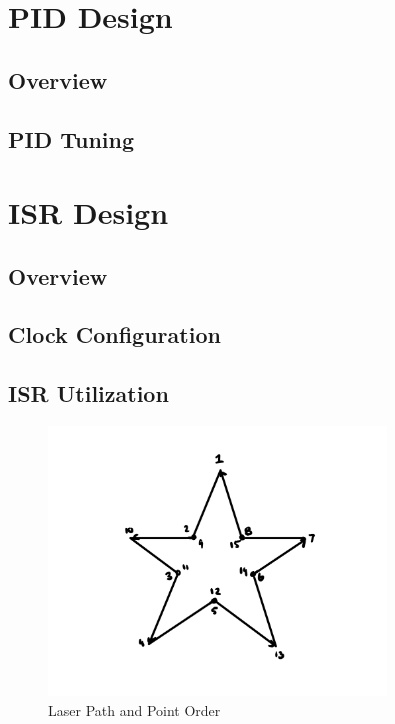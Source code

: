 \documentclass[12pt]{article}
\begin{document}
\section{PID Design}
\subsection{Overview}




\subsection{PID Tuning}



\subsection{}


\section{ISR Design}
\subsection{Overview}

\subsection{Clock Configuration}

\subsection{ISR Utilization}

\begin{figure}[ht]
    \centering
    \includegraphics[width=0.8\textwidth]{laser_path.png}
    \caption{Laser Path and Point Order}
    \label{fig:laser_path}
\end{figure}
\end{document}
